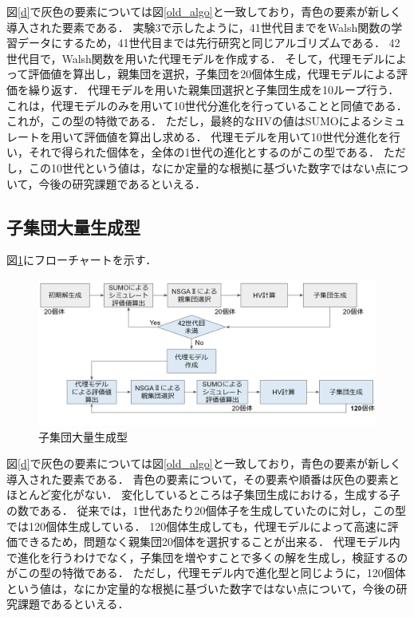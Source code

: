 \documentclass[main]{subfiles}
\begin{document}
        図\ref{d}で灰色の要素については図\ref{old_algo}と一致しており，青色の要素が新しく導入された要素である．
        実験3で示したように，41世代目までをWalsh関数の学習データにするため，41世代目までは先行研究と同じアルゴリズムである．
        42世代目で，Walsh関数を用いた代理モデルを作成する．
        そして，代理モデルによって評価値を算出し，親集団を選択，子集団を20個体生成，代理モデルによる評価を繰り返す．
        代理モデルを用いた親集団選択と子集団生成を10ループ行う．
        これは，代理モデルのみを用いて10世代分進化を行っていることと同値である．
        これが，この型の特徴である．
        ただし，最終的なHVの値はSUMOによるシミュレートを用いて評価値を算出し求める．
        代理モデルを用いて10世代分進化を行い，それで得られた個体を，全体の1世代の進化とするのがこの型である．
        ただし，この10世代という値は，なにか定量的な根拠に基づいた数字ではない点について，今後の研究課題であるといえる．
        \subsection{子集団大量生成型}
        図\ref{k}にフローチャートを示す．
        \begin{figure}
            \centering
            \includegraphics[width=\linewidth]{figures/k.png}
            \caption{子集団大量生成型}
            \label{k}
        \end{figure}

        図\ref{d}で灰色の要素については図\ref{old_algo}と一致しており，青色の要素が新しく導入された要素である．
        青色の要素について，その要素や順番は灰色の要素とほとんど変化がない．
        変化しているところは子集団生成における，生成する子の数である．
        従来では，1世代あたり20個体子を生成していたのに対し，この型では120個体生成している．
        120個体生成しても，代理モデルによって高速に評価できるため，問題なく親集団20個体を選択することが出来る．
        代理モデル内で進化を行うわけでなく，子集団を増やすことで多くの解を生成し，検証するのがこの型の特徴である．
        ただし，代理モデル内で進化型と同じように，120個体という値は，なにか定量的な根拠に基づいた数字ではない点について，今後の研究課題であるといえる．
\end{document}
